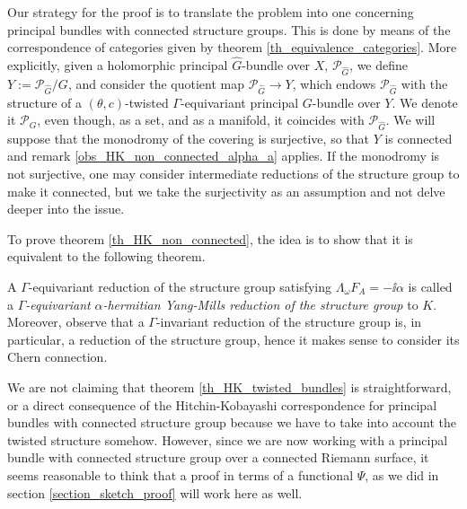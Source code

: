 Our strategy for the proof is to translate the problem into one concerning principal bundles with connected structure groups. This is done by means of the correspondence of categories given by theorem \ref{th_equivalence_categories}. More explicitly, given a holomorphic principal \(\hat{G}\)-bundle over \(X\), \(\mathcal{P}_{\hat{G}}\), we define \(Y:=\mathcal{P}_{\hat{G}}/G\), and consider the quotient map \(\mathcal{P}_{\hat{G}}\to Y\), which endows \(\mathcal{P}_{\hat{G}}\) with the structure of a \((\theta, c)\)-twisted \(\Gamma\)-equivariant principal \(G\)-bundle over \(Y\). We denote it \(\mathcal{P}_G\), even though, as a set, and as a manifold, it coincides with \(\mathcal{P}_{\hat{G}}\). We will suppose that the monodromy of the covering is surjective, so that \(Y\) is connected and remark \ref{obs_HK_non_connected_alpha_a} applies. If the monodromy is not surjective, one may consider intermediate reductions of the structure group to make it connected, but we take the surjectivity as an assumption and not delve deeper into the issue.

To prove theorem \ref{th_HK_non_connected}, the idea is to show that it is equivalent to the following theorem.

A \(\Gamma\)-equivariant reduction of the structure group satisfying \(\Lambda_\omega F_A=-\ii \alpha\) is called a \(\Gamma\)\textit{-equivariant} \(\alpha\)\textit{-hermitian Yang-Mills reduction of the structure group} to \(K\). Moreover, observe that a \(\Gamma\)-invariant reduction of the structure group is, in particular, a reduction of the structure group, hence it makes sense to consider its Chern connection.

We are not claiming that theorem \ref{th_HK_twisted_bundles} is straightforward, or a direct consequence of the Hitchin-Kobayashi correspondence for principal bundles with connected structure group because we have to take into account the twisted structure somehow. However, since we are now working with a principal bundle with connected structure group over a connected Riemann surface, it seems reasonable to think that a proof in terms of a functional \(\Psi\), as we did in section \ref{section_sketch_proof} will work here as well.

